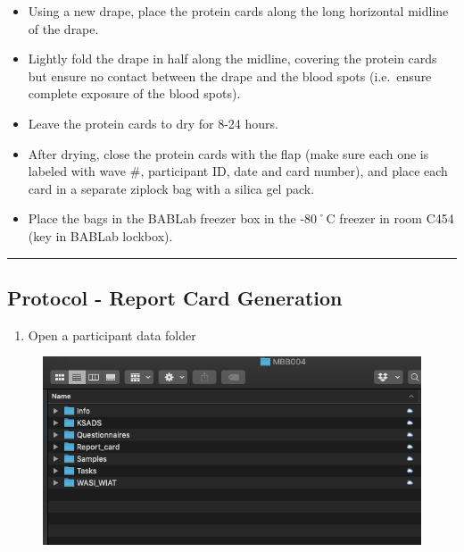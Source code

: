 \documentclass[]{book}
\providecommand{\tightlist}{%
  \setlength{\itemsep}{0pt}\setlength{\parskip}{0pt}}
\begin{document}
\begin{itemize}
\tightlist
\item
  Using a new drape, place the protein cards along the long horizontal midline of the drape.
\item
  Lightly fold the drape in half along the midline, covering the protein cards but ensure no contact between the drape and the blood spots (i.e.~ensure complete exposure of the blood spots).
\item
  Leave the protein cards to dry for 8-24 hours.
\item
  After drying, close the protein cards with the flap (make sure each one is labeled with wave \#, participant ID, date and card number), and place each card in a separate ziplock bag with a silica gel pack.
\item
  Place the bags in the BABLab freezer box in the -80˚C freezer in room C454 (key in BABLab lockbox).
\end{itemize}

\begin{center}\rule{0.5\linewidth}{0.5pt}\end{center}

\hypertarget{protocol---report-card-generation}{%
\subsection{Protocol - Report Card Generation}\label{protocol---report-card-generation}}

\begin{enumerate}
\def\labelenumi{\arabic{enumi}.}
\tightlist
\item
  Open a participant data folder
\end{enumerate}

\begin{figure}
\centering
\includegraphics{images/final_checklist/report_cards/1.png}
\caption{}
\end{figure}
\end{document}
